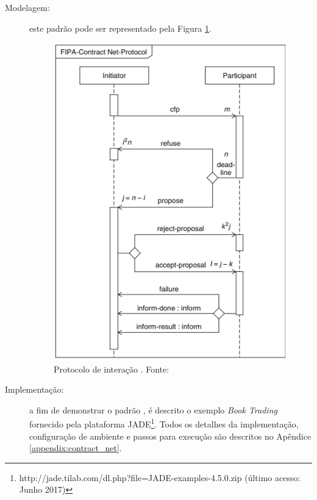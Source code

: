 \begin{description}
\item[Modelagem:] este padrão pode ser representado pela Figura \ref{fig:protocolo_interação_contract_net}.

\begin{figure}[h!]
    \centering
    \includegraphics[scale=0.5]{figuras/contract-net-sequence_diagram.png}
    \caption{Protocolo de interação \contract. Fonte: }
    \label{fig:protocolo_interação_contract_net}
\end{figure}

    \item[Implementação:] a fim de demonstrar o padrão \contract, é descrito o exemplo \textit{Book Trading} fornecido pela plataforma JADE\footnote{http://jade.tilab.com/dl.php?file=JADE-examples-4.5.0.zip (último acesso: Junho 2017)}. Todos os detalhes da implementação, configuração de ambiente e passos para execução são descritos no Apêndice \ref{appendix:contract_net}.
    
\end{description}
